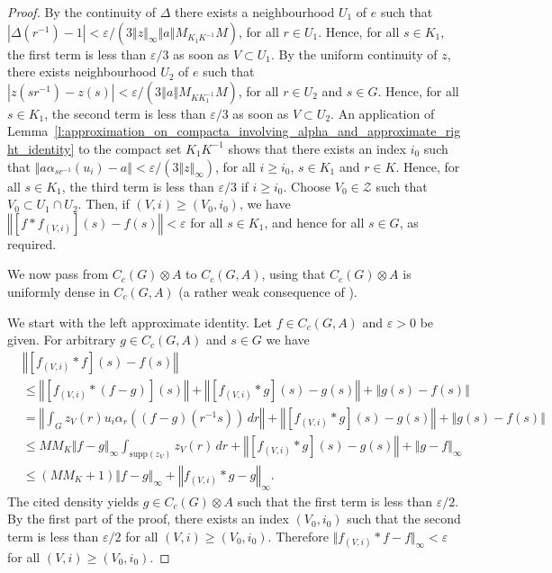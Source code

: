 \documentclass{amsart}
\theoremstyle{plain}
\theoremstyle{definition}
\numberwithin{equation}{section}
\begin{document}
\begin{proof}
By the continuity of $\Delta$ there exists a neighbourhood $U_1$ of $e$ such that $|\Delta(r^{-1})-1|<{\varepsilon}/(3\Vert z\Vert_\infty{\left\Vert {a} \right\Vert} M_{K_1 K^{-1}} M )$, for all $r\in U_1$. Hence, for all $s\in K_1$, the first term is less than ${\varepsilon}/3$ as soon as $V\subset U_1$.  By the uniform continuity of $z$, there exists neighbourhood $U_2$ of $e$ such that $|z(sr^{-1}) - z(s)|<{\varepsilon}/(3{\left\Vert {a} \right\Vert} M_{K K_1^{-1}} M )$, for all $r\in U_2$ and $s\in G$. Hence, for all $s\in K_1$, the second term is less than ${\varepsilon}/3$ as soon as $V\subset U_2$. An application of Lemma~\ref{l:approximation_on_compacta_involving_alpha_and_approximate_right_identity} to the compact set $K_1 K^{-1}$ shows that there exists an index $i_0$ such that ${\left\Vert {a \alpha_{sr^{-1}}(u_i) - a} \right\Vert}<{\varepsilon}/(3\Vert z\Vert_\infty)$, for all $i\geq i_0$, $s\in K_1$ and $r\in K$. Hence, for all $s\in K_1$, the third term is less than ${\varepsilon}/3$ if $i\geq i_0$. Choose $V_0\in\mathcal Z$ such that $V_0\subset U_1\cap U_2$. Then, if $(V,i)\geq (V_0,i_0)$, we have ${\left\Vert {[f * f_{(V,i)}](s) - f(s)} \right\Vert} < {\varepsilon}$ for all $s\in K_1$, and hence for all $s \in G$, as required.

We now pass from $C_c(G)\otimes A$ to $C_c(G,A)$, using that $C_c(G)\otimes A$ is uniformly dense in $C_c(G,A)$ (a rather weak consequence of \cite[Lemma~1.87]{williams}).

We start with the left approximate identity. Let $f\in C_c(G,A)$ and ${\varepsilon}>0$ be given. For arbitrary $g\in C_c(G,A)$ and $s\in G$ we have
\begin{align*}
&{\left\Vert {[f_{(V,i)} * f](s) - f(s)} \right\Vert}\\
&\leq {\left\Vert {[f_{(V,i)}*(f-g)](s)} \right\Vert} + {\left\Vert {[f_{(V,i)}*g](s)-g(s)} \right\Vert} + {\left\Vert {g(s)-f(s)} \right\Vert}\\
&={\left\Vert {\int_{G} z_V(r) u_i \alpha_r((f-g)(r^{-1}s))\,dr} \right\Vert} + {\left\Vert {[f_{(V,i)}*g](s)-g(s)} \right\Vert} + {\left\Vert {g(s)-f(s)} \right\Vert}\\
&\leq M  M_K \Vert f-g\Vert_\infty \int_{{\text{supp}}(z_V)} z_V(r)\, dr + {\left\Vert {[f_{(V,i)}*g](s)-g(s)} \right\Vert} + {\left\Vert {g - f} \right\Vert}_\infty\\
&\leq (M M_K + 1) \Vert f-g\Vert_\infty + {\left\Vert {f_{(V,i)} * g -g} \right\Vert}_\infty.
\end{align*}
The cited density yields $g\in C_c(G)\otimes A$ such that the first term is less than ${\varepsilon}/2$. By the first part of the proof, there exists an index $(V_0,i_0)$ such that the second term is less than ${\varepsilon}/2$ for all $(V,i)\geq (V_0,i_0)$. Therefore $\Vert f_{(V,i)}*f-f\Vert_\infty < {\varepsilon}$ for all $(V,i)\geq (V_0,i_0)$.


\end{proof}
\end{document}
